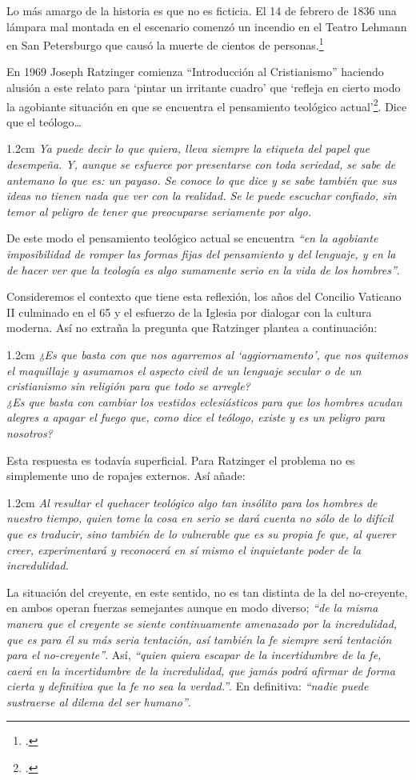 \documentclass[10pt]{article}
\newcommand{\citalitlar}[1]{
\begin{adjustwidth}{1.2cm}{}
\emph{#1}
\end{adjustwidth}
}
\begin{document}
Lo más amargo de la historia es que no es ficticia. El 14 de febrero de 1836 una
lámpara mal montada en el escenario comenzó un incendio en el Teatro Lehmann en
San Petersburgo que causó la muerte de cientos de
personas.\footcite{gerhard1896theatre}

En 1969 Joseph Ratzinger comienza ``Introducción al Cristianismo'' haciendo
  alusión a este relato para `pintar un irritante cuadro' que `refleja en cierto
  modo la agobiante situación en que se encuentra el pensamiento teológico
  actual'\footcite{introcrist}. Dice que el teólogo\ldots 
  \citalitlar{Ya puede decir lo que quiera, lleva siempre la etiqueta del papel
    que desempeña. Y, aunque se esfuerce por presentarse con toda seriedad, se
    sabe de antemano lo que es: un payaso. Se conoce lo que dice y se sabe también
    que sus ideas no tienen nada que ver con la realidad. Se le puede escuchar
    confiado, sin temor al peligro de tener que preocuparse seriamente por algo.}

  De este modo el pensamiento teológico actual se encuentra \emph{``en la
    agobiante imposibilidad de romper las formas fijas del pensamiento y del
    lenguaje, y en la de hacer ver que la teología es algo sumamente serio en la
    vida de los hombres''}.

  Consideremos el contexto que tiene esta reflexión, los años del Concilio
  Vaticano II culminado en el 65 y el esfuerzo de la Iglesia por dialogar con la
  cultura moderna. Así no extraña la pregunta que Ratzinger plantea a
  continuación: 
  \citalitlar{¿Es que basta con que nos agarremos al `aggiornamento', que nos
    quitemos el maquillaje y asumamos el aspecto civil de un lenguaje secular o de
    un cristianismo sin religión para que todo se arregle?\\ ¿Es que basta con
    cambiar los vestidos eclesiásticos para que los hombres acudan alegres a
    apagar el fuego que, como dice el teólogo, existe y es un peligro para
    nosotros?}

  Esta respuesta es todavía superficial. Para Ratzinger el problema no es
  simplemente uno de ropajes externos. Así añade:
  \citalitlar{Al resultar el quehacer teológico algo tan insólito para los hombres
    de nuestro tiempo, quien tome la cosa en serio se dará cuenta no sólo de lo
    difícil que es traducir, sino también de lo vulnerable que es su propia fe
    que, al querer creer, experimentará y reconocerá en sí mismo el inquietante
    poder de la incredulidad.}

  La situación del creyente, en este sentido, no es tan distinta de la del
  no-creyente, en ambos operan fuerzas semejantes aunque en modo diverso;
  \emph{``de la misma manera que el creyente se siente continuamente amenazado por
    la incredulidad, que es para él su más seria tentación, así también la fe
    siempre será tentación para el no-creyente''}. Así, \emph{``quien quiera
    escapar de la incertidumbre de la fe, caerá en la incertidumbre de la
    incredulidad, que jamás podrá afirmar de forma cierta y definitiva que la fe
    no sea la verdad.''}. En definitiva: \emph{``nadie puede sustraerse al dilema
    del ser humano''}.
\end{document}
